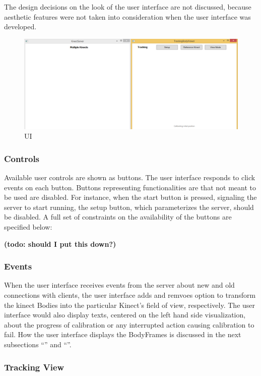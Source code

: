 \documentclass{sigchi}
\begin{document}
The design decisions on the look of the user interface are not discussed, because aesthetic features were not taken into consideration when the user interface was developed.

\begin{figure}[!h]
  \centering
  \includegraphics[width=0.9\columnwidth]{ui}
  \caption{UI}
  \label{fig:ui}
\end{figure}

\subsubsection{Controls}

Available user controls are shown as buttons. The user interface responds to click events on each button. Buttons representing functionalities are that not meant to be used are disabled. For instance, when the start button is pressed, signaling the server to start running, the setup button, which parameterizes the server, should be disabled. A full set of constraints on the availability of the buttons are specified below:

\textbf{(todo: should I put this down?)}

\subsubsection{Events}

When the user interface receives events from the server about new and old connections with clients, the user interface adds and remvoes option to transform the kinect Bodies into the particular Kinect's field of view, respectively. The user interface would also display texts, centered on the left hand side visualization, about the progress of calibration or any interrupted action causing calibration to fail. How the user interface displays the BodyFrames is discussed in the next subsections  ``'' and ``''.

\subsubsection{Tracking View}
\label{subsec:tracking_view}
\end{document}
